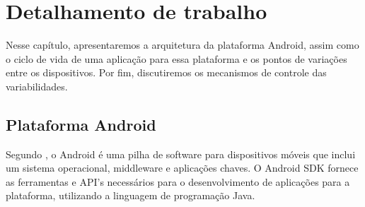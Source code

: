 
\chapter{Detalhamento de trabalho}

Nesse capítulo, apresentaremos a arquitetura da plataforma Android, assim como o
ciclo de vida de uma aplicação para essa plataforma e os pontos de variações 
entre os dispositivos. Por fim, discutiremos os 
mecanismos de controle das variabilidades.

\section{Plataforma Android}
Segundo \cite{whatisandroid}, o Android é uma pilha de software para dispositivos
móveis que inclui um sistema operacional, middleware e aplicações chaves. O Android
SDK fornece as ferramentas e API's necessários para o desenvolvimento de aplicações
para a plataforma, utilizando a linguagem de programação Java.

